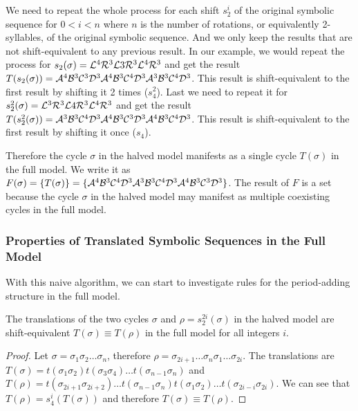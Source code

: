We need to repeat the whole process for each shift $s_2^i$ of the original symbolic sequence for $0 < i < n$ where $n$ is the number of rotations, or equivalently 2-syllables, of the original symbolic sequence.
And we only keep the results that are not shift-equivalent to any previous result.
In our example, we would repeat the process for $s_2(\sigma) = \mathcal{L}^4\mathcal{R}^3\mathcal{L}3\mathcal{R}^3\mathcal{L}^4\mathcal{R}^3$ and get the result $T(s_2(\sigma)) = \mathcal{A}^4\mathcal{B}^3\mathcal{C}^3\mathcal{D}^3\mathcal{A}^4\mathcal{B}^3\mathcal{C}^4\mathcal{D}^3\mathcal{A}^3\mathcal{B}^3\mathcal{C}^4\mathcal{D}^3$.
This result is shift-equivalent to the first result by shifting it 2 times ($s_4^2$).
Last we need to repeat it for $s_2^2(\sigma) = \mathcal{L}^3\mathcal{R}^3\mathcal{L}4\mathcal{R}^3\mathcal{L}^4\mathcal{R}^3$ and get the result $T(s_2^2(\sigma)) = \mathcal{A}^3\mathcal{B}^3\mathcal{C}^4\mathcal{D}^3\mathcal{A}^4\mathcal{B}^3\mathcal{C}^3\mathcal{D}^3\mathcal{A}^4\mathcal{B}^3\mathcal{C}^4\mathcal{D}^3$.
This result is shift-equivalent to the first result by shifting it once ($s_4$).

Therefore the cycle $\sigma$ in the halved model manifests as a single cycle $T(\sigma)$ in the full model.
We write it as $F(\sigma) = \{T(\sigma)\} = \{\mathcal{A}^4\mathcal{B}^3\mathcal{C}^4\mathcal{D}^3\mathcal{A}^3\mathcal{B}^3\mathcal{C}^4\mathcal{D}^3\mathcal{A}^4\mathcal{B}^3\mathcal{C}^3\mathcal{D}^3\}$.
The result of $F$ is a set because the cycle $\sigma$ in the halved model may manifest as multiple coexisting cycles in the full model.

\subsubsection{Properties of Translated Symbolic Sequences in the Full Model}

With this naive algorithm, we can start to investigate rules for the period-adding structure in the full model.

\begin{lemma}
    \label{lemma:equivalence.translations}
    The translations of the two cycles $\sigma$ and $\rho = s_2^{2i}(\sigma)$ in the halved model are shift-equivalent $T(\sigma) \equiv T(\rho)$ in the full model for all integers $i$.
\end{lemma}

\begin{proof}
    Let $\sigma = \sigma_1\sigma_2 \dots \sigma_n$, therefore $\rho = \sigma_{2i+1} \dots \sigma_n\sigma_1 \dots \sigma_{2i}$.
    The translations are $T(\sigma) = t(\sigma_1\sigma_2)t(\sigma_3\sigma_4) \dots t(\sigma_{n-1}\sigma_n)$
    and $T(\rho) = t(\sigma_{2i+1}\sigma_{2i+2}) \dots t(\sigma_{n-1}\sigma_n)t(\sigma_1\sigma_2) \dots t(\sigma_{2i-i}\sigma_{2i})$.
    We can see that $T(\rho) = s_4^i(T(\sigma))$ and therefore $T(\sigma) \equiv T(\rho)$.
\end{proof}

